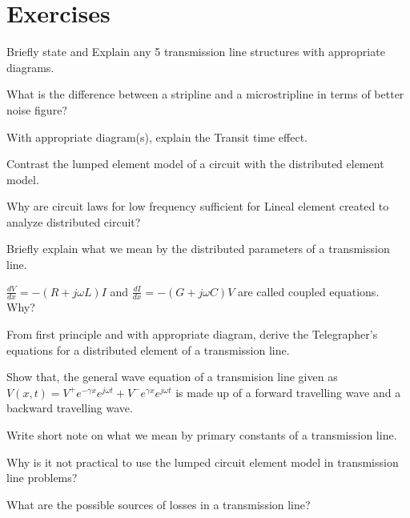\section*{Exercises}
\begin{ExerciseList}
\Exercise[label={ex21}] 
Briefly state and Explain any 5 transmission line structures with appropriate diagrams.

\Exercise[label={ex22}] 
What is the difference between a stripline and a microstripline in terms of better noise figure?

\Exercise[label={ex23}] 
With appropriate diagram(s), explain the Transit time effect.

\Exercise[label={ex24}] 
Contrast the lumped element model of a circuit with the distributed element model.

\Exercise[label={ex25}] 
Why are circuit laws for low frequency sufficient for Lineal element created to analyze distributed circuit?

\Exercise[label={ex26}] 
Briefly explain what we mean by the distributed parameters of a transmission line.

\Exercise[label={ex27}] 
$\frac{dV}{dx} = -(R + j\omega L)I$ and  $ \frac{dI}{dx} = -(G + j\omega C)V$ are called coupled equations. Why?

\Exercise[label={ex28}] 
From first principle and with appropriate diagram, derive the Telegrapher's equations for a distributed element of a transmission line.

\Exercise[label={ex29}] 
Show that, the general wave equation of a transmision line given as $ V(x,t) = V^{+} e^{-\gamma x}e^{j\omega t} + V^{-} e^{\gamma x}e^{j\omega t} $ is made up of a forward travelling wave and a backward travelling wave.

\Exercise[label={ex210}] 
Write short note on what we mean by primary constants of a transmission line.

\Exercise[label={ex211}] 
Why is it not practical to use the lumped circuit element model in transmission line problems?

\Exercise[label={ex212}] 
What are the possible sources of losses in a transmission line?
\end{ExerciseList}